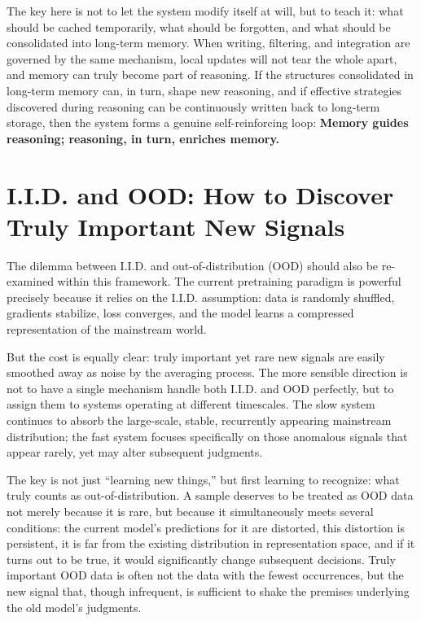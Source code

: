 The key here is not to let the system modify itself at will, but to teach it: what should be cached temporarily, what should be forgotten, and what should be consolidated into long-term memory. When writing, filtering, and integration are governed by the same mechanism, local updates will not tear the whole apart, and memory can truly become part of reasoning.
If the structures consolidated in long-term memory can, in turn, shape new reasoning, and if effective strategies discovered during reasoning can be continuously written back to long-term storage, then the system forms a genuine self-reinforcing loop:
\textbf{Memory guides reasoning; reasoning, in turn, enriches memory.}

\newpage
\section{I.I.D. and OOD: How to Discover Truly Important New Signals}

The dilemma between I.I.D. and out-of-distribution (OOD) should also be re-examined within this framework. The current pretraining paradigm is powerful precisely because it relies on the I.I.D. assumption: data is randomly shuffled, gradients stabilize, loss converges, and the model learns a compressed representation of the mainstream world.

But the cost is equally clear: truly important yet rare new signals are easily smoothed away as noise by the averaging process. The more sensible direction is not to have a single mechanism handle both I.I.D. and OOD perfectly, but to assign them to systems operating at different timescales. The slow system continues to absorb the large-scale, stable, recurrently appearing mainstream distribution; the fast system focuses specifically on those anomalous signals that appear rarely, yet may alter subsequent judgments.

\vspace{1em}

The key is not just ``learning new things,'' but first learning to recognize: what truly counts as out-of-distribution. A sample deserves to be treated as OOD data not merely because it is rare, but because it simultaneously meets several conditions: the current model's predictions for it are distorted, this distortion is persistent, it is far from the existing distribution in representation space, and if it turns out to be true, it would significantly change subsequent decisions. Truly important OOD data is often not the data with the fewest occurrences, but the new signal that, though infrequent, is sufficient to shake the premises underlying the old model's judgments.


